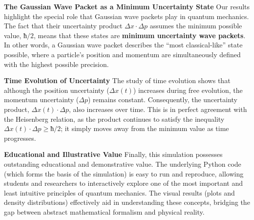\textbf{The Gaussian Wave Packet as a Minimum Uncertainty State} Our
results highlight the special role that Gaussian wave packets play in
quantum mechanics. The fact that their uncertainty product \(Δx·Δp\)
assumes the minimum possible value, \(ħ/2\), means that these states are
\textbf{minimum uncertainty wave packets}. In other words, a Gaussian
wave packet describes the ``most classical-like'' state possible, where
a particle's position and momentum are simultaneously defined with the
highest possible precision.

\textbf{Time Evolution of Uncertainty} The study of time evolution shows
that although the position uncertainty (\(Δx(t)\)) increases during free
evolution, the momentum uncertainty (\(Δp\)) remains constant.
Consequently, the uncertainty product, \(Δx(t)·Δp\), also increases over
time. This is in perfect agreement with the Heisenberg relation, as the
product continues to satisfy the inequality \(Δx(t)·Δp ≥ ħ/2\); it
simply moves away from the minimum value as time progresses.

\textbf{Educational and Illustrative Value} Finally, this simulation
possesses outstanding educational and demonstrative value. The
underlying Python code (which forms the basis of the simulation) is easy
to run and reproduce, allowing students and researchers to interactively
explore one of the most important and least intuitive principles of
quantum mechanics. The visual results (plots and density distributions)
effectively aid in understanding these concepts, bridging the gap
between abstract mathematical formalism and physical reality.
